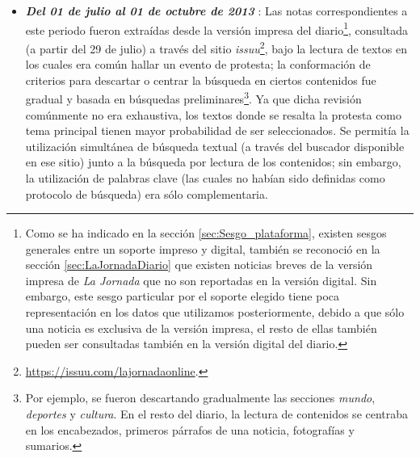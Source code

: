 \documentclass[letterpaper, 11pt]{book}
\theoremstyle{definition}
\theoremstyle{remark}
\begin{document}
\begin{itemize}
    \setlength\itemsep{0.5em}
    \item \textbf{\emph{Del 01 de julio al 01 de octubre de 2013}} :
    Las notas correspondientes a este periodo fueron extraídas desde la versión impresa del diario\footnote{
	Como se ha indicado en la sección \ref{sec:Sesgo_plataforma}, existen sesgos generales entre un soporte impreso y digital, también se reconoció en la sección \ref{sec:LaJornadaDiario} que existen noticias breves de la versión impresa de \emph{La Jornada} que no son reportadas en la versión digital. 
	Sin embargo, este sesgo particular por el soporte elegido tiene poca representación en los datos que utilizamos posteriormente, debido a que sólo una noticia es exclusiva de la versión impresa, el resto de ellas también pueden ser consultadas también en la versión digital del diario. 
    }, consultada (a partir del 29 de julio) a través del sitio \emph{issuu}\footnote{
	\url{https://issuu.com/lajornadaonline}.
    }, bajo la lectura de textos en los cuales era común hallar un evento de protesta; la conformación de criterios para descartar o centrar la búsqueda en ciertos contenidos fue gradual y basada en búsquedas preliminares\footnote{
	Por ejemplo, se fueron descartando gradualmente las secciones \emph{mundo}, \emph{deportes} y \emph{cultura}. 
	En el resto del diario, la lectura de contenidos se centraba en los encabezados, primeros párrafos de una noticia, fotografías y sumarios.
    }. 
    Ya que dicha revisión comúnmente no era exhaustiva, los textos donde se resalta la protesta como tema principal tienen mayor probabilidad de ser seleccionados. 
    Se permitía la utilización simultánea de búsqueda textual (a través del buscador disponible en ese sitio) junto a la búsqueda por lectura de los contenidos; 
    sin embargo, la utilización de palabras clave (las cuales no habían sido definidas como protocolo de búsqueda) era sólo complementaria. 
        

\end{itemize}
\end{document}
